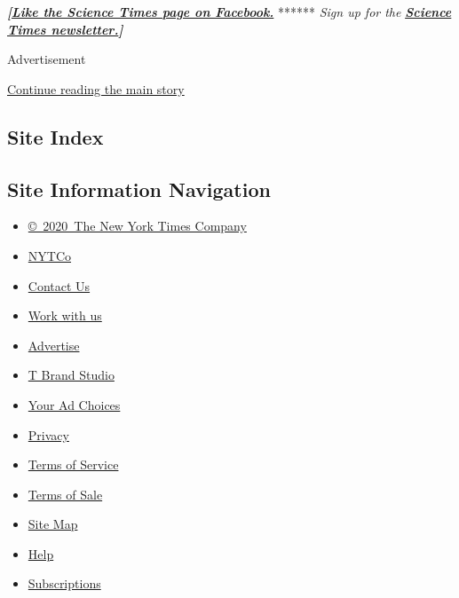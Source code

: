 \textbf{\emph{{[}}\href{http://on.fb.me/1paTQ1h}{\emph{Like the Science
Times page on Facebook.}}} ****** \emph{\textbar{} Sign up for the}
\textbf{\href{http://nyti.ms/1MbHaRU}{\emph{Science Times
newsletter.}}\emph{{]}}}

Advertisement

\protect\hyperlink{after-bottom}{Continue reading the main story}

\hypertarget{site-index}{%
\subsection{Site Index}\label{site-index}}

\hypertarget{site-information-navigation}{%
\subsection{Site Information
Navigation}\label{site-information-navigation}}

\begin{itemize}
\tightlist
\item
  \href{https://help.nytimes.com/hc/en-us/articles/115014792127-Copyright-notice}{©~2020~The
  New York Times Company}
\end{itemize}

\begin{itemize}
\tightlist
\item
  \href{https://www.nytco.com/}{NYTCo}
\item
  \href{https://help.nytimes.com/hc/en-us/articles/115015385887-Contact-Us}{Contact
  Us}
\item
  \href{https://www.nytco.com/careers/}{Work with us}
\item
  \href{https://nytmediakit.com/}{Advertise}
\item
  \href{http://www.tbrandstudio.com/}{T Brand Studio}
\item
  \href{https://www.nytimes.com/privacy/cookie-policy\#how-do-i-manage-trackers}{Your
  Ad Choices}
\item
  \href{https://www.nytimes.com/privacy}{Privacy}
\item
  \href{https://help.nytimes.com/hc/en-us/articles/115014893428-Terms-of-service}{Terms
  of Service}
\item
  \href{https://help.nytimes.com/hc/en-us/articles/115014893968-Terms-of-sale}{Terms
  of Sale}
\item
  \href{https://spiderbites.nytimes.com}{Site Map}
\item
  \href{https://help.nytimes.com/hc/en-us}{Help}
\item
  \href{https://www.nytimes.com/subscription?campaignId=37WXW}{Subscriptions}
\end{itemize}
